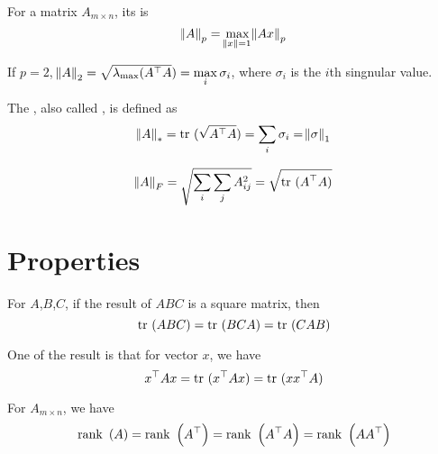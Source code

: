 \begin{definition}
   For a matrix $A_{m \times n}$, its  is
\begin{equation}
    \norm{A}_p = \max\limits_{\norm{x}=1} \norm{Ax}_p
\end{equation}

If $p=2$, $\norm{A}_2 = \sqrt{\lambda_{\mathrm{max}} ( {A}^\top A}) = \max\limits_i \sigma_i$, where $\sigma_i$ is the $i$th singnular value.
 
\end{definition}

\begin{definition}
    The , also called , is defined as
\begin{equation}
    \norm{A}_* = \displaystyle \mathrm{tr}~( \sqrt{{A}^\top A} ) = \sum_i \sigma_i = \norm{\sigma}_1
\end{equation}
\end{definition}

\begin{definition}
    \begin{equation}
        \norm{A}_F = \sqrt{\sum_i \sum_j A_{ij}^2} = \sqrt{\displaystyle \mathrm{tr}~( {A}^\top A )}
    \end{equation}
\end{definition}


\section{Properties}

\begin{theorem}
    For $A$,$B$,$C$, if the result of $ABC$ is a square matrix, then
    \begin{equation}
        \displaystyle \mathrm{tr}~( ABC ) = \displaystyle \mathrm{tr}~( BCA ) = \displaystyle \mathrm{tr}~( CAB )
    \end{equation}
    
    One of the result is that for vector $x$, we have
    \begin{equation}
        {x}^\top A x = \displaystyle \mathrm{tr}~( {x}^\top Ax ) = \displaystyle \mathrm{tr}~( x {x}^\top A )
    \end{equation}
\end{theorem}

\begin{theorem}
    For $A_{m \times n}$, we have
    \begin{equation}
        \displaystyle \mathrm{rank}~\left( A \right) = \displaystyle \mathrm{rank}~\left( {A}^\top \right) = \displaystyle \mathrm{rank}~\left( {A}^\top A \right) = \displaystyle \mathrm{rank}~\left( A {A}^\top \right)
    \end{equation}    
\end{theorem}


